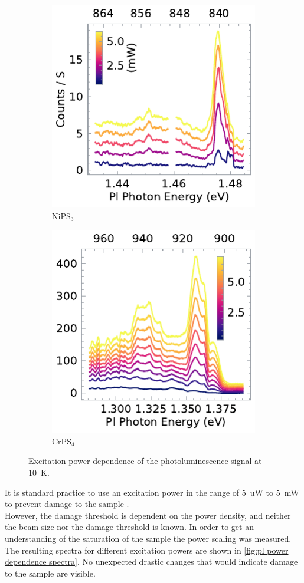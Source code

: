 \documentclass[
	twoside,
	parskip=half,
	a4paper,
]{scrbook}
\begin{document}
\begin{figure}
	\centering
	\begin{subfigure}{2.5in}
		\includegraphics{../figures/2024-04-06 NiPS3 excitation power dependence.pdf}
		\caption{NiPS$_3$}
	\end{subfigure}
	\begin{subfigure}{2.5in}
		\includegraphics{../figures/2023-12-14 CrPS4 excitation power dependence.pdf}
		\caption{CrPS$_4$}
	\end{subfigure}
	\caption{Excitation power dependence of the photoluminescence signal at \SI{10}{K}.}
	\label{fig:pl power dependence spectra}
\end{figure}
It is standard practice to use an excitation power in the range of \SI{5}{uW} to \SI{5}{mW} to prevent damage to the sample \cite{NiPS3_anisotropic, NiPS3_exciton}.\\
However, the damage threshold is dependent on the power density, and neither the beam size nor the damage threshold is known.
In order to get an understanding of the saturation of the sample the power scaling was measured.\\
The resulting spectra for different excitation powers are shown in \autoref{fig:pl power dependence spectra}.
No unexpected drastic changes that would indicate damage to the sample are visible.\\
\end{document}
